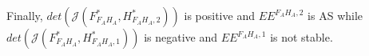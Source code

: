 \documentclass{article}
\begin{document}
\begin{itemize}
Finally, $det(\mathcal{J}(F^*_{F_AH_A}, H^*_{F_AH_A, 2}))$ is positive and $EE^{F_AH_A, 2}$ is AS while $det(\mathcal{J}(F^*_{F_AH_A}, H^*_{F_AH_A, 1}))$ is negative and $EE^{F_AH_A, 1}$ is not stable.
%
%
%
%

\end{itemize}
\end{document}
